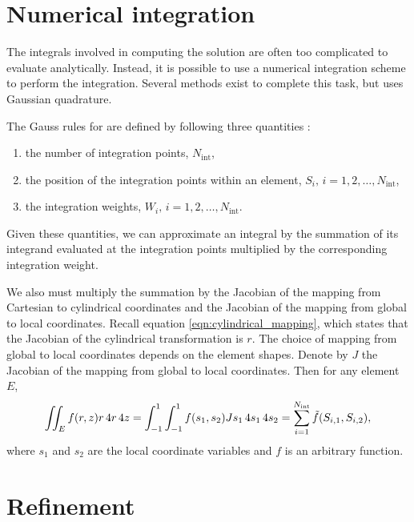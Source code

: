 
\section{Numerical integration}
\label{sec:integration}

The integrals involved in computing the solution are often too complicated to evaluate analytically.
Instead, it is possible to use a numerical integration scheme to perform the integration.
Several methods exist to complete this task, but \oomph uses Gaussian quadrature.


The Gauss rules for \oomph are defined by following three quantities \cite{oomph}:
\begin{enumerate}
	\item the number of integration points, $N_\mathrm{int}$,
	\item the position of the integration points within an element, $S_i, \, i=1,2,\ldots,N_\mathrm{int}$,
	\item the integration weights, $W_i, \, i=1,2,\ldots,N_\mathrm{int}$.
\end{enumerate} 
Given these quantities, we can approximate an integral by the summation of its integrand evaluated at the integration points multiplied by the corresponding integration weight.

We also must multiply the summation by the Jacobian of the mapping from Cartesian to cylindrical coordinates and the Jacobian of the mapping from global to local coordinates.
Recall equation \eqref{eqn:cylindrical_mapping}, which states that the Jacobian of the cylindrical transformation is $r$.
The choice of mapping from global to local coordinates depends on the element shapes.
Denote by $J$ the Jacobian of the mapping from global to local coordinates.
Then for any element $E$, 
\begin{align}
	\iint_E f(r,z) r \,4 r \,4 z = \int_{-1}^1 \int_{-1}^1  f(s_1, s_2) J s_1 \, 4 s_1 \, 4 s_2 = \sum_{i=1}^{N_\mathrm{int}} \tilde{f}(S_{i,1},S_{i,2}),
\end{align}
where $s_1$ and $s_2$ are the local coordinate variables and $f$ is an arbitrary function.






\section{Refinement}

